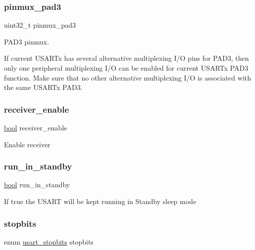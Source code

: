 \subsubsection{\texorpdfstring{pinmux\_pad3}{pinmux\_pad3}}
{\footnotesize\ttfamily uint32\+\_\+t pinmux\+\_\+pad3}

P\+A\+D3 pinmux.

If current U\+S\+A\+R\+Tx has several alternative multiplexing I/O pins for P\+A\+D3, then only one peripheral multiplexing I/O can be enabled for current U\+S\+A\+R\+Tx P\+A\+D3 function. Make sure that no other alternative multiplexing I/O is associated with the same U\+S\+A\+R\+Tx P\+A\+D3. \mbox{\label{structusart__config_aeb0ee3a89acb7a67727a62a68adf0120}} 
\subsubsection{\texorpdfstring{receiver\_enable}{receiver\_enable}}
{\footnotesize\ttfamily \mbox{\hyperlink{group__group__sam0__utils_ga97a80ca1602ebf2303258971a2c938e2}{bool}} receiver\+\_\+enable}

Enable receiver \mbox{\label{structusart__config_a514964d5c2a8da4dd96bac82a53477f2}} 
\subsubsection{\texorpdfstring{run\_in\_standby}{run\_in\_standby}}
{\footnotesize\ttfamily \mbox{\hyperlink{group__group__sam0__utils_ga97a80ca1602ebf2303258971a2c938e2}{bool}} run\+\_\+in\+\_\+standby}

If true the U\+S\+A\+RT will be kept running in Standby sleep mode \mbox{\label{structusart__config_a6613fcda1e5a9a287ee8902ba28de724}} 
\subsubsection{\texorpdfstring{stopbits}{stopbits}}
{\footnotesize\ttfamily enum \mbox{\hyperlink{group__asfdoc__sam0__sercom__usart__group_gab7d8ac715e2bd7ccddc65bf2c5ceb1f5}{usart\+\_\+stopbits}} stopbits}

